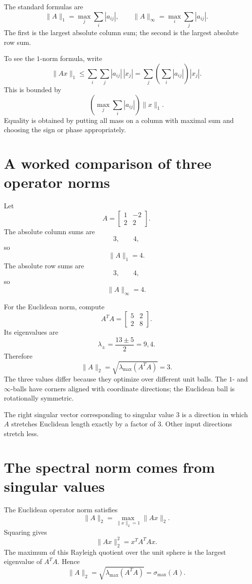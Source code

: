 The standard formulas are
\[
  \|A\|_1=\max_j\sum_i|a_{ij}|,
  \qquad
  \|A\|_\infty=\max_i\sum_j|a_{ij}|.
\]
The first is the largest absolute column sum; the second is the largest absolute row sum.

To see the \(1\)-norm formula, write
\[
  \|Ax\|_1
  \le \sum_i\sum_j|a_{ij}|\,|x_j|
  =\sum_j\left(\sum_i|a_{ij}|\right)|x_j|.
\]
This is bounded by
\[
  \left(\max_j\sum_i|a_{ij}|\right)\|x\|_1.
\]
Equality is obtained by putting all mass on a column with maximal sum and choosing the sign or phase appropriately.

\section{A worked comparison of three operator norms}

Let
\[
  A=
  \begin{bmatrix}
    1&-2\\
    2&2
  \end{bmatrix}.
\]
The absolute column sums are
\[
  3,\qquad4,
\]
so
\[
  \|A\|_1=4.
\]
The absolute row sums are
\[
  3,\qquad4,
\]
so
\[
  \|A\|_\infty=4.
\]

For the Euclidean norm, compute
\[
  A^TA=
  \begin{bmatrix}
    5&2\\
    2&8
  \end{bmatrix}.
\]
Its eigenvalues are
\[
  \lambda_\pm=\frac{13\pm5}{2}=9,4.
\]
Therefore
\[
  \|A\|_2=\sqrt{\lambda_{\max}(A^TA)}=3.
\]
The three values differ because they optimize over different unit balls.  The \(1\)- and \(\infty\)-balls have corners aligned with coordinate directions; the Euclidean ball is rotationally symmetric.

The right singular vector corresponding to singular value \(3\) is a direction in which \(A\) stretches Euclidean length exactly by a factor of \(3\).  Other input directions stretch less.

\section{The spectral norm comes from singular values}

The Euclidean operator norm satisfies
\[
  \|A\|_2
  =\max_{\|x\|_2=1}\|Ax\|_2.
\]
Squaring gives
\[
  \|Ax\|_2^2=x^TA^TAx.
\]
The maximum of this Rayleigh quotient over the unit sphere is the largest eigenvalue of \(A^TA\).  Hence
\[
  \boxed{
  \|A\|_2=\sqrt{\lambda_{\max}(A^TA)}=\sigma_{\max}(A).}
\]


